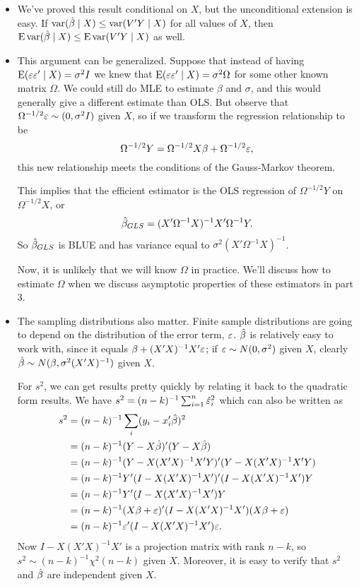 \begin{itemize}
\item We've proved this result conditional on $X$, but the
  unconditional extension is easy.  If $\operatorname{var}(\hat{\beta} \mid X) \leq \operatorname{var}(V'Y \mid X)$
  for all values of $X$, then $\operatorname{E} \operatorname{var}(\hat{\beta} \mid X) \leq \operatorname{E} \operatorname{var}(V'Y \mid X)$ as
  well.

\item This argument can be generalized.  Suppose that instead of
  having $\operatorname{E}(\varepsilon \varepsilon' \mid X) = \sigma^2 I$ we knew that $\operatorname{E}(\varepsilon \varepsilon' \mid X) = \sigma^2
  \Omega$ for some other known matrix $\Omega$.  We could still do MLE to
  estimate $\beta$ and $\sigma$, and this would generally give a different
  estimate than OLS.  But observe that $\Omega^{-1/2} \varepsilon \sim (0, \sigma^2 I)$ given
  $X$, so if we transform the regression relationship to be
  \begin{equation*}
    \Omega^{-1/2} Y = \Omega^{-1/2} X \beta + \Omega^{-1/2} \varepsilon,
  \end{equation*}
  this new relationship meets the conditions of the Gauss-Markov
  theorem.

  This implies that the efficient estimator is the OLS regression of
  $\Omega^{-1/2} Y$ on $\Omega^{-1/2} X$, or
  \begin{equation*}
    \hat{\beta}_{GLS} = (X'\Omega^{-1}X)^{-1}X'\Omega^{-1}Y.
  \end{equation*}
  So $\hat{\beta}_{GLS}$ is BLUE and has variance equal to $\sigma^2 (X' \Omega^{-1}
  X)^{-1}$.

  Now, it is unlikely that we will know $\Omega$ in practice.  We'll
  discuss how to estimate $\Omega$ when we discuss asymptotic properties of
  these estimators in part 3.

\item The sampling distributions also matter.  Finite sample
  distributions are going to depend on the distribution of the error
  term, $\varepsilon$.  $\hat{\beta}$ is relatively easy to work with, since it equals
  $\beta + (X'X)^{-1} X'\varepsilon$; if $\varepsilon \sim N(0, \sigma^2)$ given $X$, clearly
  $\hat{\beta} \sim N(\beta, \sigma^2(X'X)^{-1})$ given $X$.

  For $s^2$, we can get results pretty quickly by relating it back to
  the quadratic form results. We have $s^2 = (n-k)^{-1} \sum_{i=1}^n \hat{\varepsilon}^2_i$
  which can also be written as
  \begin{align*}
    s^2 &= (n-k)^{-1} \sum_i (y_i - x_i'\hat{\beta})^2 \\
    &= (n-k)^{-1} (Y - X\hat{\beta})'(Y - X\hat{\beta}) \\
    &= (n-k)^{-1} (Y - X(X'X)^{-1}X'Y)'(Y - X(X'X)^{-1}X'Y) \\
    &= (n-k)^{-1} Y'(I - X(X'X)^{-1}X')'(I - X(X'X)^{-1}X')Y \\
    &= (n-k)^{-1} Y'(I - X(X'X)^{-1}X')Y \\
    &= (n-k)^{-1} (X\beta + \varepsilon)'(I - X(X'X)^{-1}X')(X\beta + \varepsilon) \\
    &= (n-k)^{-1} \varepsilon'(I - X(X'X)^{-1}X')\varepsilon.
  \end{align*}
  Now $I - X(X'X)^{-1}X'$ is a projection matrix with rank $n-k$, so
  $s^2 \sim (n-k)^{-1} \chi^2(n-k)$ given $X$.  Moreover, it is easy to verify
  that $s^2$ and $\hat{\beta}$ are independent given $X$.


\end{itemize}
